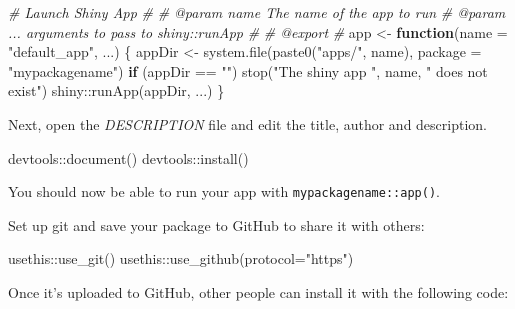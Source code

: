 \documentclass[
]{book}
\newenvironment{Shaded}{\begin{snugshade}}{\end{snugshade}}
\newcommand{\AttributeTok}[1]{\textcolor[rgb]{0.77,0.63,0.00}{#1}}
\newcommand{\CommentTok}[1]{\textcolor[rgb]{0.56,0.35,0.01}{\textit{#1}}}
\newcommand{\ControlFlowTok}[1]{\textcolor[rgb]{0.13,0.29,0.53}{\textbf{#1}}}
\newcommand{\FunctionTok}[1]{\textcolor[rgb]{0.00,0.00,0.00}{#1}}
\newcommand{\NormalTok}[1]{#1}
\newcommand{\OtherTok}[1]{\textcolor[rgb]{0.56,0.35,0.01}{#1}}
\newcommand{\SpecialCharTok}[1]{\textcolor[rgb]{0.00,0.00,0.00}{#1}}
\newcommand{\StringTok}[1]{\textcolor[rgb]{0.31,0.60,0.02}{#1}}
\begin{document}
\begin{Shaded}
\begin{Highlighting}[]
\CommentTok{\#\textquotesingle{} Launch Shiny App}
\CommentTok{\#\textquotesingle{}}
\CommentTok{\#\textquotesingle{} @param name The name of the app to run}
\CommentTok{\#\textquotesingle{} @param ... arguments to pass to shiny::runApp}
\CommentTok{\#\textquotesingle{}}
\CommentTok{\#\textquotesingle{} @export}
\CommentTok{\#\textquotesingle{}}
\NormalTok{app }\OtherTok{\textless{}{-}} \ControlFlowTok{function}\NormalTok{(}\AttributeTok{name =} \StringTok{"default\_app"}\NormalTok{, ...) \{}
\NormalTok{  appDir }\OtherTok{\textless{}{-}} \FunctionTok{system.file}\NormalTok{(}\FunctionTok{paste0}\NormalTok{(}\StringTok{"apps/"}\NormalTok{, name), }\AttributeTok{package =} \StringTok{"mypackagename"}\NormalTok{)}
  \ControlFlowTok{if}\NormalTok{ (appDir }\SpecialCharTok{==} \StringTok{""}\NormalTok{) }\FunctionTok{stop}\NormalTok{(}\StringTok{"The shiny app "}\NormalTok{, name, }\StringTok{" does not exist"}\NormalTok{)}
\NormalTok{  shiny}\SpecialCharTok{::}\FunctionTok{runApp}\NormalTok{(appDir, ...)}
\NormalTok{\}}
\end{Highlighting}
\end{Shaded}

Next, open the \emph{DESCRIPTION} file and edit the title, author and description.

\begin{Shaded}
\begin{Highlighting}[]
\NormalTok{devtools}\SpecialCharTok{::}\FunctionTok{document}\NormalTok{()}
\NormalTok{devtools}\SpecialCharTok{::}\FunctionTok{install}\NormalTok{()}
\end{Highlighting}
\end{Shaded}

You should now be able to run your app with \texttt{mypackagename::app()}.

Set up git and save your package to GitHub to share it with others:

\begin{Shaded}
\begin{Highlighting}[]
\NormalTok{usethis}\SpecialCharTok{::}\FunctionTok{use\_git}\NormalTok{()}
\NormalTok{usethis}\SpecialCharTok{::}\FunctionTok{use\_github}\NormalTok{(}\AttributeTok{protocol=}\StringTok{"https"}\NormalTok{)}
\end{Highlighting}
\end{Shaded}

Once it's uploaded to GitHub, other people can install it with the following code:
\end{document}

